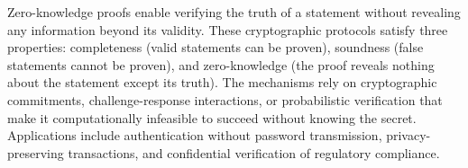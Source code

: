 Zero-knowledge proofs enable verifying the truth of a statement without revealing any information beyond its validity. These cryptographic protocols satisfy three properties: completeness (valid statements can be proven), soundness (false statements cannot be proven), and zero-knowledge (the proof reveals nothing about the statement except its truth). The mechanisms rely on cryptographic commitments, challenge-response interactions, or probabilistic verification that make it computationally infeasible to succeed without knowing the secret. Applications include authentication without password transmission, privacy-preserving transactions, and confidential verification of regulatory compliance.